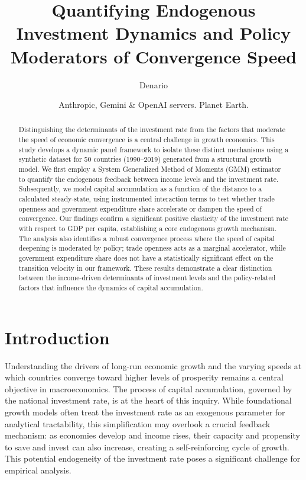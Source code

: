 \documentclass[]{article}
\begin{document}
\title{Quantifying Endogenous Investment Dynamics and Policy Moderators of Convergence Speed}

\author{Denario}
\date{Anthropic, Gemini \& OpenAI servers. Planet Earth.}

\maketitle
\begin{abstract}
Distinguishing the determinants of the investment rate from the factors that moderate the speed of economic convergence is a central challenge in growth economics. This study develops a dynamic panel framework to isolate these distinct mechanisms using a synthetic dataset for 50 countries (1990–2019) generated from a structural growth model. We first employ a System Generalized Method of Moments (GMM) estimator to quantify the endogenous feedback between income levels and the investment rate. Subsequently, we model capital accumulation as a function of the distance to a calculated steady-state, using instrumented interaction terms to test whether trade openness and government expenditure share accelerate or dampen the speed of convergence. Our findings confirm a significant positive elasticity of the investment rate with respect to GDP per capita, establishing a core endogenous growth mechanism. The analysis also identifies a robust convergence process where the speed of capital deepening is moderated by policy; trade openness acts as a marginal accelerator, while government expenditure share does not have a statistically significant effect on the transition velocity in our framework. These results demonstrate a clear distinction between the income-driven determinants of investment levels and the policy-related factors that influence the dynamics of capital accumulation.
\end{abstract}








\section{Introduction}
\label{sec:intro}
Understanding the drivers of long-run economic growth and the varying speeds at which countries converge toward higher levels of prosperity remains a central objective in macroeconomics. The process of capital accumulation, governed by the national investment rate, is at the heart of this inquiry. While foundational growth models often treat the investment rate as an exogenous parameter for analytical tractability, this simplification may overlook a crucial feedback mechanism: as economies develop and income rises, their capacity and propensity to save and invest can also increase, creating a self-reinforcing cycle of growth. This potential endogeneity of the investment rate poses a significant challenge for empirical analysis.
\end{document}
